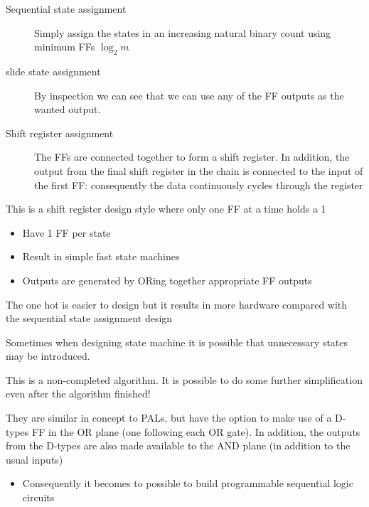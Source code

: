 \documentclass[a4paper]{article}
\begin{document}
\begin{defi}
\begin{description}
\item[Sequential state assignment]
Simply assign the states in an increasing natural binary count using minimum FFs $\log_{2}m$
\item[slide state assignment]
By inspection we can see that we can use any of the FF outputs as the wanted output.
\item[Shift register assignment]
The FFs are connected together to form a shift register. In addition, the output from the final shift register in the chain is connected to the input of the first FF: consequently the data continuously cycles through the register
\end{description}
\begin{defi}
This is a shift register design style where only one FF at a time holds a 1
\begin{itemize}
\item Have 1 FF per state
\item Result in simple fast state machines
\item Outputs are generated by ORing together appropriate FF outputs
\end{itemize}
\begin{note}
The one hot is easier to design but it results in more hardware compared with the sequential state assignment design
\end{note}
\end{defi}
\end{defi}

\begin{defi}
Sometimes when designing state machine it is possible that unnecessary states may be introduced.
\begin{wn}
This is a non-completed algorithm. It is possible to do some further simplification even after the algorithm finished!
\end{wn}
\end{defi}

\begin{defi}
They are similar in concept to PALs, but have the option to make use of a D-types FF in the OR plane (one following each OR gate). In addition, the outputs from the D-types are also made available to the AND plane (in addition to the usual inputs)
\begin{itemize}
\item Consequently it becomes to possible to build programmable sequential logic circuits
\end{itemize}
\end{defi}
\end{document}
